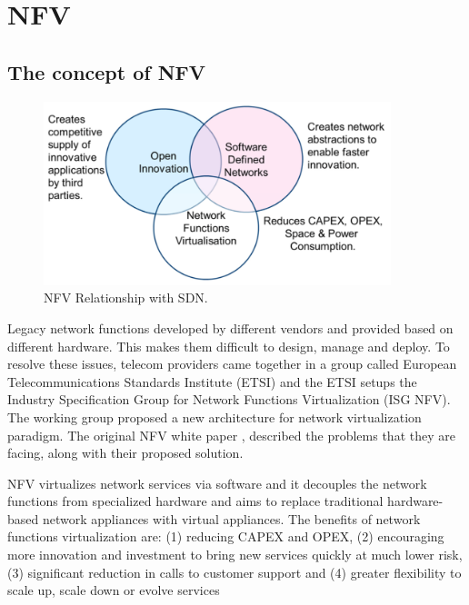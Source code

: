 \section{NFV} \label{sec:nfv}

\subsection{The concept of NFV}

\begin{figure}[!t]
\centering
\includegraphics[width=0.9\textwidth]{./fig/nfv_and_sdn.png}
\caption{NFV Relationship with SDN. \cite{nfv-wp}}
\label{fig:nfv_and_sdn}
\end{figure}

Legacy network functions developed by different vendors and provided based on different hardware. This makes them difficult to design, manage and deploy.
To resolve these issues, telecom providers came together in a group called European Telecommunications Standards Institute (ETSI) and the ETSI setups the Industry Specification Group for Network Functions Virtualization (ISG NFV). The working group proposed a new architecture for network virtualization paradigm. The original NFV white paper \cite{nfv-wp}, described the problems that they are facing, along with their proposed solution.

NFV virtualizes network services via software and it decouples the network functions from specialized hardware and aims to replace traditional hardware-based network appliances with virtual appliances.
The benefits of network functions virtualization are: (1) reducing CAPEX and OPEX, (2) encouraging more innovation and investment to bring new services quickly at much lower risk, (3) significant reduction in calls to customer support and (4) greater flexibility to scale up, scale down or evolve services



